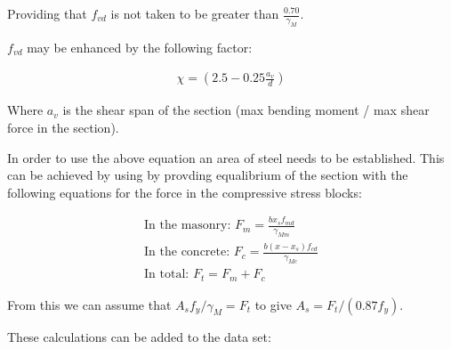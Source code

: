 \documentclass[11pt]{article}
\begin{document}
Providing that \(f_{vd}\) is not taken to be greater than
\(\frac{0.70}{\gamma_M}\).

\(f_{vd}\) may be enhanced by the following factor:

\begin{align}
\chi = (2.5 - 0.25 \frac{a_v}{d})
\end{align}

Where \(a_v\) is the shear span of the section (max bending moment / max
shear force in the section).

In order to use the above equation an area of steel needs to be
established. This can be achieved by using by provding equalibrium of
the section with the following equations for the force in the
compressive stress blocks:

\begin{align}
\text{In the masonry: }
F_m = \frac{b x_s f_{md}}{\gamma_{Mm}}\\
\text{In the concrete: }
F_c = \frac{b (x - x_s)f_{cd}}{\gamma_{Mc}}\\
\text{In total: } F_t = F_m + F_c
\end{align}

From this we can assume that \(A_s f_y / \gamma_M = F_t\) to give
\(A_s = F_t / (0.87 f_y)\).

These calculations can be added to the data set:
\end{document}
